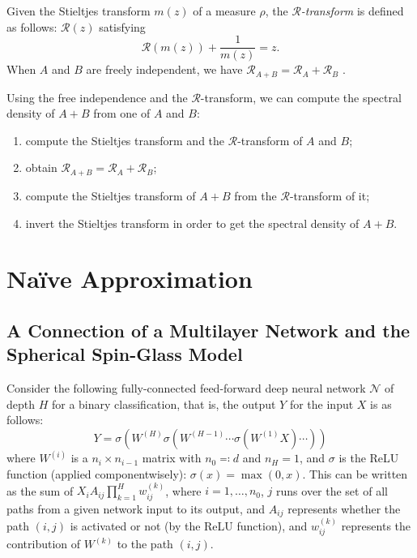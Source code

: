 \documentclass[notitlepage]{report}
\begin{document}
Given the Stieltjes transform $m(z)$ of a measure $\rho$, the \emph{$\mathcal R$-transform} is defined as follows: $\mathcal R(z)$ satisfying
\[ \mathcal R(m(z)) + \frac 1 {m(z)} = z. \]
When $A$ and $B$ are freely independent, we have $\mathcal R_{A+B} = \mathcal R_A + \mathcal R_B$ \cite{speicher}.

Using the free independence and the $\mathcal R$-transform, we can compute the spectral density of $A+B$ from one of $A$ and $B$:
\begin{enumerate}
    \item compute the Stieltjes transform and the $\mathcal R$-transform of $A$ and $B$;
    \item obtain $\mathcal R_{A+B} = \mathcal R_A + \mathcal R_B$;
    \item compute the Stieltjes transform of $A+B$ from the $\mathcal R$-transform of it;
    \item invert the Stieltjes transform in order to get the spectral density of $A+B$.
\end{enumerate}

\section{Na\"ive Approximation}
\subsection{A Connection of a Multilayer Network and the Spherical Spin-Glass Model \cite{choromanska}}

Consider the following fully-connected feed-forward deep neural network $\mathcal N$ of depth $H$ for a binary classification, that is, the output $Y$ for the input $X$ is as follows:
\[ Y = \sigma(W^{(H)} \sigma(W^{(H-1)}\cdots\sigma(W^{(1)} X)\cdots)) \]
where $W^{(i)}$ is a $n_{i}\times n_{i-1}$ matrix with $n_0\eqqcolon d$ and $n_H = 1$, and $\sigma$ is the ReLU function (applied componentwisely): $\sigma(x) = \max(0,x)$. This can be written as the sum of $X_i A_{ij} \prod_{k=1}^H w_{ij}^{(k)}$, where $i=1,\dots,n_0$, $j$ runs over the set of all paths from a given network input to its output, and $A_{ij}$ represents whether the path $(i,j)$ is activated or not (by the ReLU function), and $w_{ij}^{(k)}$ represents the contribution of $W^{(k)}$ to the path $(i,j)$.
\end{document}
